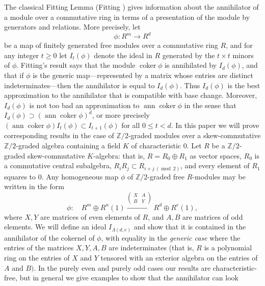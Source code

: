 \documentclass{tran-l}
\theoremstyle{plain}
\theoremstyle{remark}
\theoremstyle{definition}
\newcommand{\coker}{\operatorname{coker}}
\newcommand{\ann}{\operatorname{ann}}
\newcommand{\ZZ}{\mathbb {Z}}
\begin{document}
The classical Fitting Lemma (Fitting \cite{Fit}) gives information
about the annihilator of a module over a commutative ring in terms
of a presentation of the module by generators and relations.
More precisely, let
\begin{equation*}\phi : R^{m} \to R^{d}
\end{equation*}
be a map of finitely generated free modules over a commutative ring
$R$, and for any integer $t\geq 0$ 
let $I_{t}(\phi )$ denote the ideal in $R$ generated by the 
$t\times t$ minors of $\phi $.
Fitting's result says that the module $\coker \phi $
is annihilated by $I_{d}(\phi )$, and that if $\phi $ is the 
generic map---represented by a matrix whose entries 
are distinct indeterminates---then the
annihilator is equal to $I_{d}(\phi )$. 
Thus $I_{d}(\phi )$ is the best approximation to the
annihilator that is compatible with base change. Moreover, 
$I_{d}(\phi )$ is not too bad an approximation to $\ann \coker \phi $
in the sense that 
$I_{d}(\phi )\supset (\ann \coker \phi )^{d}$, or more precisely
$(\ann \coker \phi )I_{t}(\phi )\subset I_{t+1}(\phi )$ for all $0\leq t<d$.
In this paper we will
prove corresponding results in the case 
of $\ZZ /2$-graded modules over a
skew-commutative $\ZZ /2$-graded algebra containing a field $K$
of characteristic 0.
Let $R$ be a 
$\ZZ /2$-graded skew-commutative $K$-algebra: that is, $R=R_{0}\oplus R_{1}$ as vector spaces, $R_{0}$ is a commutative central subalgebra,
$R_{i}R_{j}\subset R_{i+j\ (\operatorname{mod}\ 2)}$, and every element of
$R_{1}$ squares to 0. Any homogeneous map $\phi $ of $\ZZ /2$-graded free
$R$-modules may be written in the form
\begin{equation*}\phi :\quad R^{m}\oplus R^{n}(1)
\xrightarrow{\left(\begin{smallmatrix} X &A\\ B&Y \end{smallmatrix}
\right)}
R^{d}\oplus R^{e}(1),
\end{equation*}
where $X, Y$ are matrices of even elements of $R$, and $A, B$ are
matrices of odd elements. We will define an ideal 
$I_{\Lambda (d,e)}$ and
show that it is contained in the
annihilator of
the cokernel of $\phi $, with equality 
in the {\em generic case\/} where the entries of the matrices
$X,Y,A,B$ are
indeterminates (that is,
$R$ is a polynomial ring on the entries of $X$ and $Y$
tensored with an exterior algebra on the entries of $A$ and $B)$. 
In the purely even and purely odd cases our results are
characteristic-free, but in general we 
give examples to show that the annihilator can look 
\end{document}
